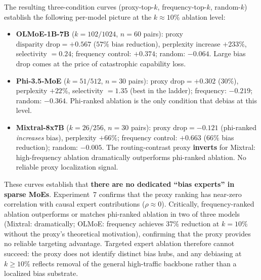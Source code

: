 \documentclass[11pt,a4paper]{article}
\begin{document}
The resulting three-condition curves (proxy-top-$k$, frequency-top-$k$, random-$k$) establish the following per-model picture at the $k \approx 10\%$ ablation level:
\begin{itemize}
    \item \textbf{OLMoE-1B-7B} ($k=102/1024$, $n=60$ pairs): proxy $\text{disparity drop} = +0.567$ ($57\%$ bias reduction), perplexity increase $+233\%$, selectivity $= 0.24$; frequency control: $+0.374$; random: $-0.064$. Large bias drop comes at the price of catastrophic capability loss.
    \item \textbf{Phi-3.5-MoE} ($k=51/512$, $n=30$ pairs): proxy $\text{drop} = +0.302$ ($30\%$), perplexity $+22\%$, selectivity $= 1.35$ (best in the ladder); frequency: $-0.219$; random: $-0.364$. Phi-ranked ablation is the only condition that debias at this level.
    \item \textbf{Mixtral-8x7B} ($k=26/256$, $n=30$ pairs): proxy $\text{drop} = -0.121$ (phi-ranked \emph{increases} bias), perplexity $+66\%$; frequency control: $+0.663$ ($66\%$ bias reduction); random: $-0.005$. The routing-contrast proxy \textbf{inverts} for Mixtral: high-frequency ablation dramatically outperforms phi-ranked ablation. No reliable proxy localization signal.
\end{itemize}

These curves establish that \textbf{there are no dedicated ``bias experts'' in sparse MoEs}. Experiment~7 confirms that the proxy ranking has near-zero correlation with causal expert contributions ($\rho \approx 0$). Critically, frequency-ranked ablation outperforms or matches phi-ranked ablation in two of three models (Mixtral: dramatically; OLMoE: frequency achieves 37\% reduction at $k=10\%$ without the proxy's theoretical motivation), confirming that the proxy provides no reliable targeting advantage. Targeted expert ablation therefore cannot succeed: the proxy does not identify distinct bias hubs, and any debiasing at $k \geq 10\%$ reflects removal of the general high-traffic backbone rather than a localized bias substrate.
\end{document}
